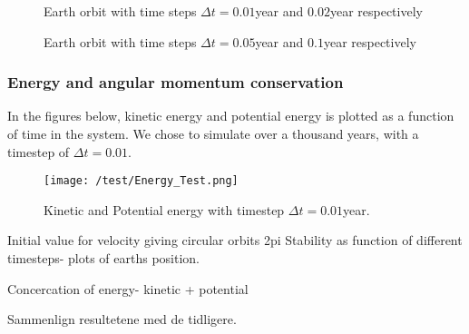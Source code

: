 \documentclass[../main.tex]{subfiles}
\begin{document}
\begin{figure}[!h]
  \centering
  \caption{Earth orbit with time steps $\Delta t = 0.01$year and $0.02$year respectively }
  \label{fig:results-Timestep1}
\end{figure}
\FloatBarrier
\begin{figure}[!h]
  \centering
  \caption{Earth orbit with time steps $\Delta t = 0.05$year and $0.1$year respectively }
  \label{fig:results-Timestep2}
\end{figure}
\FloatBarrier

\subsubsection{Energy and angular momentum conservation}\label{sec:results-test-conservation}
In the figures below, kinetic energy and potential energy is plotted as a function of time in the system. We chose to simulate over a thousand years, with a timestep of $\Delta t = 0.01$.
\begin{figure}[!h]
  \centering
  \texttt{[image: /test/Energy\_Test.png]} %
  \caption{Kinetic and Potential energy with timestep $\Delta t = 0.01$year.}
  \label{fig:results-Energies}
\end{figure}
\FloatBarrier

Initial value for velocity giving circular orbits 2pi
Stability as function of different timesteps- plots of earths position.

Concercation of energy- kinetic + potential

Sammenlign resultetene med de tidligere.
\end{document}
